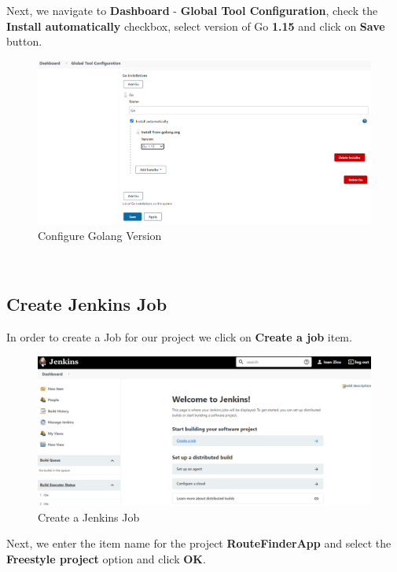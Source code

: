 \documentclass[12pt,a4paper,twoside]{article}
\begin{document}
Next, we navigate to \textbf{Dashboard} - \textbf{Global Tool Configuration}, check the \textbf{Install automatically} checkbox, select version of Go \textbf{1.15} and click on \textbf{Save} button.


\begin{figure}[h!]
    \centering
        \includegraphics[width=15cm]{images-aws/31-go-global-tool.png}
        \caption{Configure Golang Version}
\end{figure}



~\newpage


\subsection{Create Jenkins Job}


In order to create a Job for our project we click on 
\textbf{Create a job} item.


\begin{figure}[H]
    \centering
        \includegraphics[width=15cm]{images-aws/32-jenkins-create-job.png}
        \caption{Create a Jenkins Job}
\end{figure}


Next, we enter the item name for the project \textbf{RouteFinderApp} and select the \textbf{Freestyle project} option and click \textbf{OK}.
\end{document}
